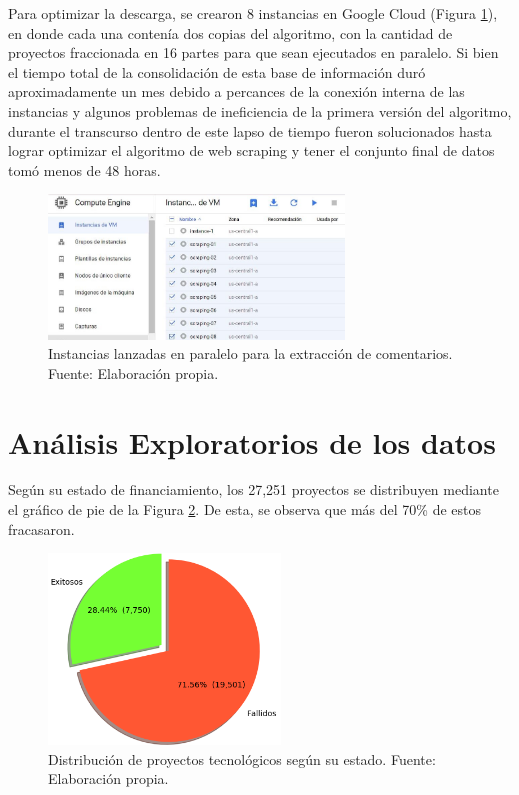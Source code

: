 Para optimizar la descarga, se crearon 8 instancias en Google Cloud (Figura \ref{4:fig10}), en donde cada una contenía dos copias del algoritmo, con la cantidad de proyectos fraccionada en 16 partes para que sean ejecutados en paralelo. Si bien el tiempo total de la consolidación de esta base de información duró aproximadamente un mes debido a percances de la conexión interna de las instancias y algunos problemas de ineficiencia de la primera versión del algoritmo, durante el transcurso dentro de este lapso de tiempo fueron solucionados hasta lograr optimizar el algoritmo de web scraping y tener el conjunto final de datos tomó menos de 48 horas.

\begin{figure}[!ht]
	\begin{center}
		\includegraphics[width=0.7\textwidth]{4/figures/gc_instances_comments.jpg}
		\caption{Instancias lanzadas en paralelo para la extracción de comentarios. Fuente: Elaboración propia.}
		\label{4:fig10}
	\end{center}
\end{figure}

\section{Análisis Exploratorios de los datos}
Según su estado de financiamiento, los 27,251 proyectos se distribuyen mediante el gráfico de pie de la Figura \ref{4:fig11}. De esta, se observa que más del 70\% de estos fracasaron.

\begin{figure}[!ht]
	\begin{center}
		\includegraphics[width=0.55\textwidth]{4/figures/projects by state.png}
		\caption{Distribución de proyectos tecnológicos según su estado. Fuente: Elaboración propia.}
		\label{4:fig11}
	\end{center}
\end{figure}



